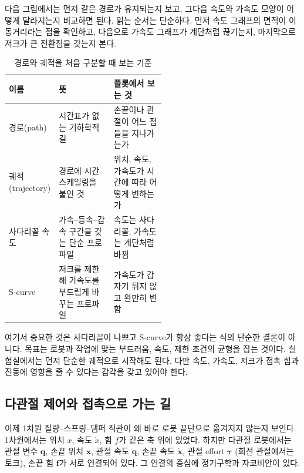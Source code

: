 다음 그림에서는 먼저 같은 경로가 유지되는지 보고, 그다음 속도와 가속도 모양이 어떻게 달라지는지 비교하면 된다.
읽는 순서는 단순하다.
먼저 속도 그래프의 면적이 이동거리라는 점을 확인하고, 다음으로 가속도 그래프가 계단처럼 끊기는지, 마지막으로 저크가 큰 전환점을 갖는지 본다.



\begin{table}[!htbp]
  \centering
  \caption{경로와 궤적을 처음 구분할 때 보는 기준}
  \label{tab:path-trajectory-profile}
  \small
  \renewcommand{\arraystretch}{1.12}
  \begin{tabularx}{\linewidth}{@{}p{0.18\linewidth}p{0.35\linewidth}X@{}}
    \toprule
    이름 & 뜻 & 플롯에서 보는 것 \\
    \midrule
    경로(path) & 시간표가 없는 기하학적 길 & 손끝이나 관절이 어느 점들을 지나가는가 \\
    궤적(trajectory) & 경로에 시간 스케일링을 붙인 것 & 위치, 속도, 가속도가 시간에 따라 어떻게 변하는가 \\
    사다리꼴 속도 & 가속--등속--감속 구간을 갖는 단순 프로파일 & 속도는 사다리꼴, 가속도는 계단처럼 바뀜 \\
    S-curve & 저크를 제한해 가속도를 부드럽게 바꾸는 프로파일 & 가속도가 갑자기 튀지 않고 완만히 변함 \\
    \bottomrule
  \end{tabularx}
\end{table}

여기서 중요한 것은 사다리꼴이 나쁘고 S-curve가 항상 좋다는 식의 단순한 결론이 아니다.
목표는 로봇과 작업에 맞는 부드러움, 속도, 제한 조건의 균형을 잡는 것이다.
실험실에서는 먼저 단순한 궤적으로 시작해도 된다.
다만 속도, 가속도, 저크가 접촉 힘과 진동에 영향을 줄 수 있다는 감각을 갖고 있어야 한다.

\subsection{다관절 제어와 접촉으로 가는 길}
\label{sec:robotics-multijoint-contact-bridge}

이제 1차원 질량--스프링--댐퍼 직관이 왜 바로 로봇 끝단으로 옮겨지지 않는지 보인다.
1차원에서는 위치 \(x\), 속도 \(\dot{x}\), 힘 \(f\)가 같은 축 위에 있었다.
하지만 다관절 로봇에서는 관절 변수 \(\bm{q}\), 손끝 위치 \(\bm{x}\), 관절 속도 \(\dot{\bm{q}}\), 손끝 속도 \(\dot{\bm{x}}\), 관절 effort \(\bm{\tau}\) (회전 관절에서는 토크), 손끝 힘 \(\bm{f}\)가 서로 연결되어 있다.
%
그 연결의 중심에 정기구학과 자코비안이 있다.

